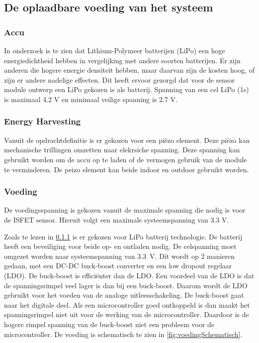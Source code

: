

\subsection{De oplaadbare voeding van het systeem} \label{sec:energy}
\subsubsection{Accu} \label{sec:batterijOntwerp}
In onderzoek \cite{BatteryComparison} is te zien dat Lithium-Polymeer batterijen (LiPo) een hoge energiedichtheid hebben in vergelijking met andere soorten batterijen. Er zijn anderen die hogere energie densiteit hebben, maar daarvan zijn de kosten hoog, of zijn er andere nadelige effecten\cite{BatteryComparison}. Dit heeft ervoor gezorgd dat voor de sensor module ontwerp een LiPo gekozen is als batterij. Spanning van een cel LiPo (1s) is maximaal 4.2 V en minimaal veilige spanning is 2.7 V\cite{BatteryComparison}.

\subsubsection{Energy Harvesting}

Vanuit de opdrachtdefinitie is er gekozen voor een piëzo element. Deze piëzo kan mechanische trillingen omzetten naar elekrsiche spanning. Deze spanning kan gebruikt worden om de accu op te laden of de vermogen gebruik van de module te verminderen. De peizo element kan beide indoor en outdoor gebruikt worden.


\subsubsection{Voeding} \label{sec:voeding}


De voedingsspanning is gekozen vanuit de maximale spanning die nodig is voor de ISFET sensor\cite{isfet}. Hieruit volgt een maximale systeemspanning van 3.3 V.


Zoals te lezen in \cref{sec:batterijOntwerp} is er gekozen voor LiPo batterij technologie. De batterij heeft een beveiliging voor beide op- en ontladen nodig. De celspanning moet omgezet worden naar systeemspanning van \qty{3.3}{\volt}. Dit wordt op 2 manieren gedaan, met een DC-DC buck-boost converter en een low dropout regelaar (LDO). De buck-boost is efficiënter dan de LDO. Een voordeel van de LDO is dat de spanningsrimpel veel lager is dan bij een buck-boost. Daarom wordt de LDO gebruikt voor het voeden van de analoge uitleesschakeling. De buck-boost gaat naar het digitale deel. Als een microcontroller goed ontkoppeld is dan maakt het spanningsrimpel niet uit voor de werking van de microcontroller. Daardoor is de hogere rimpel spanning van de buck-boost niet een probleem voor de microcontroller. De voeding is schematisch te zien in \cref{fig:voedingSchematisch}.

